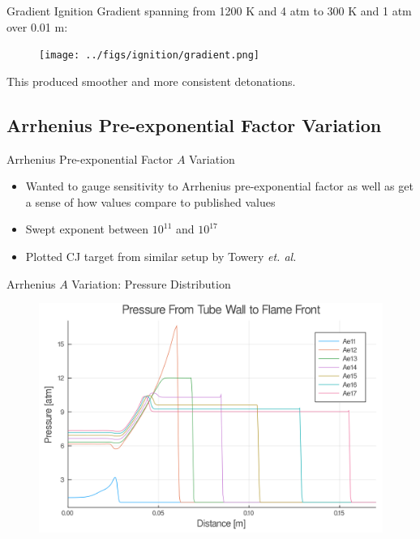 \begin{frame}{Gradient Ignition}
Gradient spanning from 1200 K and 4 atm to 300 K and 1 atm over 0.01 m:
\begin{figure}[]
\centering
\texttt{[image: ../figs/ignition/gradient.png]}
\end{figure}%
This produced smoother and more consistent detonations. 
\end{frame}


\subsection{Arrhenius Pre-exponential Factor Variation}

\begin{frame}{Arrhenius Pre-exponential Factor $A$ Variation}
\begin{itemize}
\item Wanted to gauge sensitivity to Arrhenius pre-exponential factor as well as get a sense of how values compare to published values
\item Swept exponent between $10^{11}$ and $10^{17}$ 
\item Plotted CJ target from similar setup by Towery \textit{et. al.} \cite{towery1}
\end{itemize}
\end{frame}

\begin{frame}{Arrhenius $A$ Variation: Pressure Distribution}
\begin{figure}
\centering
\includegraphics[width=0.8\linewidth]{../figs/Atest/p.png}
\end{figure}
\end{frame}

